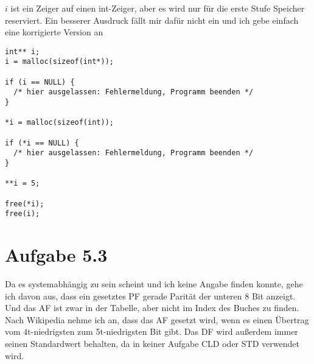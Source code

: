 \documentclass[10pt,a4paper]{article}
\begin{document}
$i$ ist ein Zeiger auf einen int-Zeiger, aber es wird nur für die erste Stufe Speicher reserviert.
Ein besserer Ausdruck fällt mir dafür nicht ein und ich gebe einfach eine korrigierte Version an
\begin{lstlisting}
int** i;
i = malloc(sizeof(int*));

if (i == NULL) {
  /* hier ausgelassen: Fehlermeldung, Programm beenden */ 
}

*i = malloc(sizeof(int));

if (*i == NULL) {
  /* hier ausgelassen: Fehlermeldung, Programm beenden */ 
}

**i = 5;

free(*i);
free(i);
\end{lstlisting}

\section*{Aufgabe 5.3}

Da es systemabhängig zu sein scheint und ich keine Angabe finden konnte, gehe ich davon aus, dass ein gesetztes PF gerade Parität der unteren 8 Bit anzeigt.
Und das AF ist zwar in der Tabelle, aber nicht im Index des Buches zu finden.
Nach Wikipedia nehme ich an, dass das AF gesetzt wird, wenn es einen Übertrag vom 4t-niedrigsten zum 5t-niedrigsten Bit gibt.
Das DF wird außerdem immer seinen Standardwert behalten, da in keiner Aufgabe CLD oder STD verwendet wird.
\end{document}
